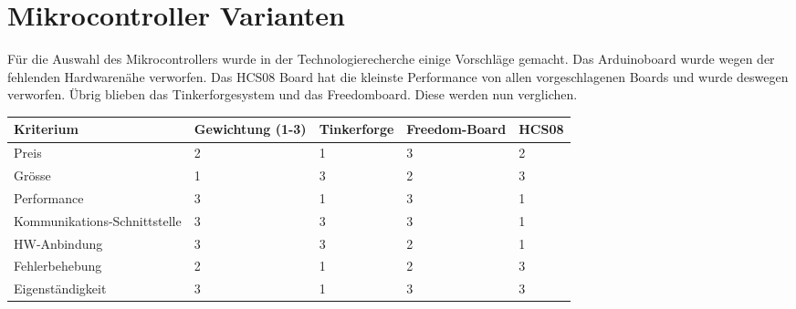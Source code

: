 \section{Mikrocontroller Varianten}

Für die Auswahl des Mikrocontrollers wurde in der Technologierecherche einige Vorschläge gemacht. Das Arduinoboard wurde wegen der fehlenden Hardwarenähe verworfen. Das HCS08 Board hat die kleinste Performance von allen vorgeschlagenen Boards und wurde deswegen verworfen.
Übrig blieben das Tinkerforgesystem und das Freedomboard. Diese werden nun verglichen.
\begin{table}[h]
\begin{tabular}{|p{4.5cm}|p{3.5cm}|p{2cm}|p{2cm}|p{2cm}|}\hline
	
	\textbf{Kriterium}	& 	\textbf{Gewichtung (1-3)} & \textbf{Tinkerforge} & \textbf{Freedom-Board} & \textbf{HCS08}\\\hline
	{Preis}	& 	{2} & {1} & {3} & {2}\\\hline
	{Grösse}	& 	{1} & {3} & {2} & {3}\\\hline
	{Performance}	& 	{3} & {1} & {3} & {1}\\\hline
	{Kommunikations-Schnittstelle}	& 	{3} & {3} & {3} & {1}\\\hline
	{HW-Anbindung}	& 	{3} & {3} & {2} & {1}\\\hline
	{Fehlerbehebung}	& 	{2} & {1} & {2} & {3}\\\hline
	{Eigenständigkeit}	& 	{3} & {1} & {3} & {3}\\\hline	
	
	
	
\end{tabular}\\
\end{table}